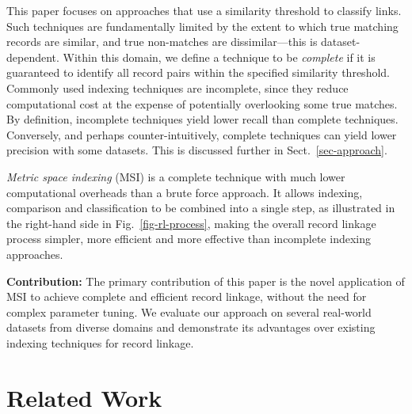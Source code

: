 \documentclass{llncs}
\begin{document}
This paper focuses on approaches that use a similarity threshold to
classify links. Such techniques are fundamentally limited by the extent
to which true matching records are similar, and true non-matches are
dissimilar---this is dataset-dependent. Within this domain, we define
a technique to be \emph{complete} if it is guaranteed to identify all
record pairs within the specified similarity threshold. Commonly used
indexing techniques are incomplete, since they reduce computational
cost at the expense of potentially overlooking some true matches. By
definition, incomplete techniques yield lower recall than complete
techniques. Conversely, and perhaps counter-intuitively, complete
techniques can yield lower precision with some datasets. This is
discussed further in Sect.~\ref{sec-approach}.

\emph{Metric space indexing} (MSI) is a complete technique with much
lower computational overheads than a brute force approach. It allows
indexing, comparison and classification to be combined into a single
step, as illustrated in the right-hand side in
Fig.~\ref{fig-rl-process}, making the overall record linkage process
simpler, more efficient and more effective than incomplete indexing
approaches.

\smallskip
\textbf{Contribution:} The primary contribution of this paper is the
novel application of MSI to achieve complete and efficient record
linkage, without the need for complex parameter tuning. We evaluate our
approach on several real-world datasets from diverse domains and
demonstrate its advantages over existing indexing techniques for
record linkage.




\section{Related Work}
\label{sec-related}
\end{document}

